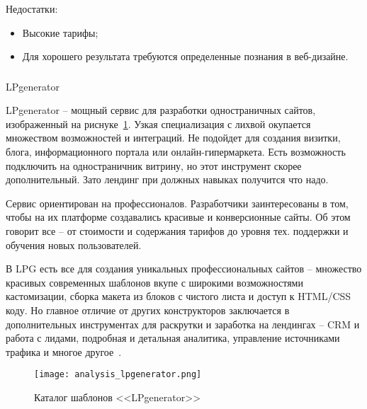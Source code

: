 Недостатки:

\begin{itemize}
	\item Высокие тарифы;
	\item Для хорошего результата требуются определенные познания в веб-дизайне.
\end{itemize}

\subsubsection{}LPgenerator
\

LPgenerator -- мощный сервис для разработки одностраничных сайтов, изображенный на риснуке~\ref{sec:analysis:lpgenerator}. Узкая специализация с лихвой окупается множеством возможностей и интеграций. Не подойдет для создания визитки, блога, информационного портала или онлайн-гипермаркета. Есть возможность подключить на одностраничник витрину, но этот инструмент скорее дополнительный. Зато лендинг при должных навыках получится что надо.

Сервис ориентирован на профессионалов. Разработчики заинтересованы в том, чтобы на их платформе создавались красивые и конверсионные сайты. Об этом говорит все -- от стоимости и содержания тарифов до уровня тех. поддержки и обучения новых пользователей. 

В LPG есть все для создания уникальных профессиональных сайтов -- множество красивых современных шаблонов вкупе с широкими возможностями кастомизации, сборка макета из блоков с чистого листа и доступ к HTML/CSS коду. Но главное отличие от других конструкторов заключается в дополнительных инструментах для раскрутки и заработка на лендингах -- CRM и работа с лидами, подробная и детальная аналитика, управление источниками трафика и многое другое~\cite{cms_examples}.

\begin{figure}
\centering
	\texttt{[image: analysis\_lpgenerator.png]}
	\caption{Каталог шаблонов <<LPgenerator>>}
	\label{sec:analysis:lpgenerator}
\end{figure}